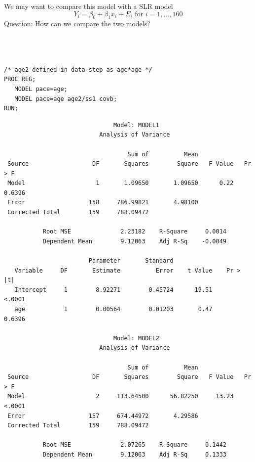 \newpage
 
We may want to compare this model with a SLR model 
$$ Y_i = \beta_0 + \beta_1 x_i + E_i \mbox{ for }i=1,\ldots,160$$
Question: How can we compare the two models?\\~\\~\\~\\

\begin{small}
\begin{verbatim}
/* age2 defined in data step as age*age */ 
PROC REG;
   MODEL pace=age;      
   MODEL pace=age age2/ss1 covb;
RUN;
\end{verbatim}
\end{small}
\begin{large}
\begin{verbatim}
                               Model: MODEL1
                           Analysis of Variance
 
                                   Sum of          Mean
 Source                  DF       Squares        Square   F Value   Pr > F
 Model                    1       1.09650       1.09650      0.22   0.6396
 Error                  158     786.99821       4.98100                   
 Corrected Total        159     788.09472                                 

           Root MSE              2.23182    R-Square     0.0014
           Dependent Mean        9.12063    Adj R-Sq    -0.0049

                        Parameter       Standard
   Variable     DF       Estimate          Error    t Value    Pr > |t|
   Intercept     1        8.92271        0.45724      19.51      <.0001
   age           1        0.00564        0.01203       0.47      0.6396

                               Model: MODEL2
                           Analysis of Variance
 
                                   Sum of          Mean
 Source                  DF       Squares        Square   F Value   Pr > F
 Model                    2     113.64500      56.82250     13.23   <.0001
 Error                  157     674.44972       4.29586                   
 Corrected Total        159     788.09472                                 

           Root MSE              2.07265    R-Square     0.1442
           Dependent Mean        9.12063    Adj R-Sq     0.1333
\end{verbatim}
\end{large}


